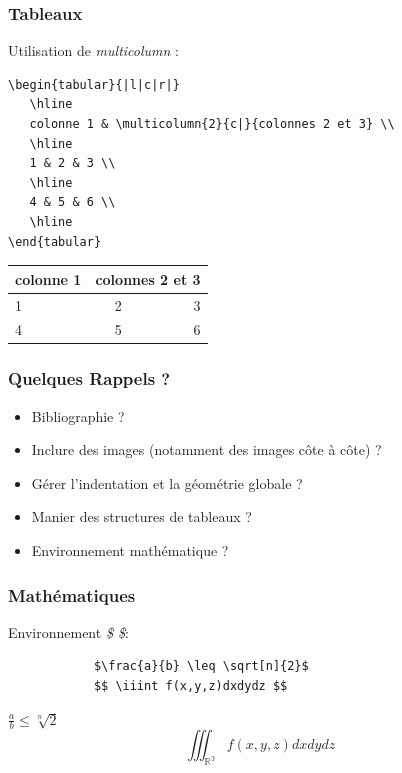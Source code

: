 \documentclass[handout]{beamer}
\begin{document}
\begin{frame}[fragile=singleslide]
	\frametitle{Tableaux}
	\centering
	Utilisation de \textit{multicolumn} :
	\begin{verbatim}
\begin{tabular}{|l|c|r|}
   \hline
   colonne 1 & \multicolumn{2}{c|}{colonnes 2 et 3} \\
   \hline
   1 & 2 & 3 \\
   \hline
   4 & 5 & 6 \\
   \hline
\end{tabular}
	\end{verbatim}

	\begin{tabular}{|l|c|r|}
	   \hline
	   colonne 1 & \multicolumn{2}{c|}{colonnes 2 et 3} \\
	   \hline
	   1 & 2 & 3 \\
	   \hline
	   4 & 5 & 6 \\
	   \hline
	\end{tabular}

\end{frame}

	\begin{frame}
		\frametitle{Quelques Rappels ?}
		\begin{itemize}
			\item Bibliographie ?
			\item Inclure des images (notamment des images côte à côte) ?
			\item Gérer l'indentation et la géométrie globale ?
			\item Manier des structures de tableaux ?
			\item Environnement mathématique ?
		\end{itemize}
	\end{frame}

	\begin{frame}[fragile=singleslide]
		\frametitle{Mathématiques}

		\centering
		Environnement \textit{\$ \$}:
		\begin{verbatim}
			$\frac{a}{b} \leq \sqrt[n]{2}$
			$$ \iiint f(x,y,z)dxdydz $$
		\end{verbatim}

		$\frac{a}{b} \leq \sqrt[n]{2}$
		$$ \iiint_{\mathbb{R^3}} f(x,y,z)dxdydz $$

	\end{frame}
\end{document}
